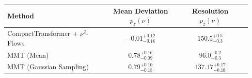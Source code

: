     \begin{tabular}{lccc}
        \toprule
        Method & Mean Deviation $p_{z}(\nu)$ & Resolution $p_{z}(\nu)$ \\
        \midrule
        CompactTransformer + $\nu^2$-Flows & $-0.01^{+0.12}_{-0.16}$ & $150.5^{+0.5}_{-0.3}$ \\
        MMT (Mean) & $0.78^{+0.16}_{-0.09}$ & $96.0^{+0.2}_{-0.3}$ \\
        MMT (Gaussian Sampling) & $0.79^{+0.10}_{-0.18}$ & $137.17^{+0.17}_{-0.18}$ \\
        \bottomrule
    \end{tabular}